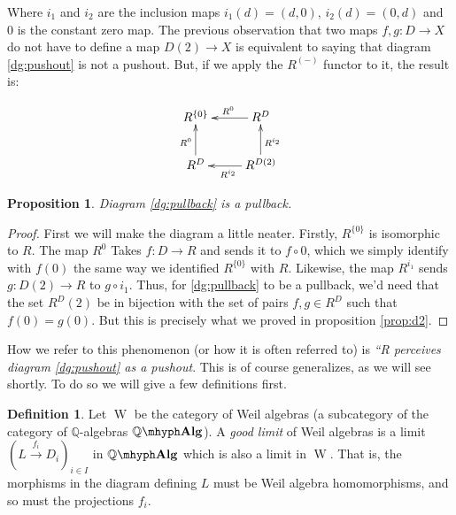 \documentclass[11pt]{article}
\newtheorem{proposition}{Proposition}[section]
\theoremstyle{definition}
\newtheorem{defn}{Definition}[section]
\newcommand{\farg}{-} %
\newcommand{\Q}{\mathbb{Q}}
\newcommand{\qalg}{\Q\mhyph\mathbf{Alg}}
\newcommand{\walg}{\operatorname W}
\numberwithin{equation}{section}
\begin{document}
Where \( i_1 \) and \( i_2 \) are the inclusion maps \( i_1(d)=(d,0),\, i_2(d)=(0,d) \) and \( 0 \) is the constant zero map. The previous observation that two maps \( f,g:D\to X \) do not have to define a map \( D(2)\to X \) is equivalent to saying that diagram \ref{dg:pushout} is not a pushout. But, if we apply the \( R^{(\farg)} \) functor to it, the result is:

\begin{equation*}
  \xymatrix{
    R^{\{0\}}       & R^D \ar[l]_{R^0}                           \\
    R^D \ar[u]^{R^0} & R^{D(2)} \ar[u]_{R^{i_2}} \ar[l]^{R^{i_2}} 
  }
  \label{dg:pullback}
\end{equation*}

\begin{proposition}
  Diagram \ref{dg:pullback} is a pullback.
  \label{prop:pullback}
\end{proposition}

\begin{proof}
  First we will make the diagram a little neater. Firstly, \( R^{\{0\}} \) is isomorphic to \( R \). The map \( R^0 \) Takes \( f:D\to R \) and sends it to \( f\circ 0 \), which we simply identify with \( f(0) \) the same way we identified \( R^{\{0\}} \) with \( R \). Likewise, the map \( R^{i_1} \) sends \( g:D(2)\to R \) to \( g\circ i_1 \). Thus, for \ref{dg:pullback} to be a pullback, we'd need that the set \( R^D(2) \) be in bijection with the set of pairs \( f,g\in R^D \) such that \( f(0)=g(0) \). But this is precisely what we proved in proposition \ref{prop:d2}.
\end{proof}

How we refer to this phenomenon (or how it is often referred to) is \emph{``R perceives diagram \ref{dg:pushout} as a pushout}. This is of course generalizes, as we will see shortly. To do so we will give a few definitions first.

\begin{defn}
  Let \( \walg \) be the category of Weil algebras (a subcategory of the category of \( \Q \)-algebras \( \qalg \)). A \emph{good limit} of Weil algebras is a limit \( \left(L\stackrel{f_i}{\longrightarrow}D_i\right)_{i\in I} \) in \( \qalg \) which is also a limit in \( \walg \). That is, the morphisms in the diagram defining \( L \) must be Weil algebra homomorphisms, and so must the projections \( f_i \).
\end{defn}
\end{document}
